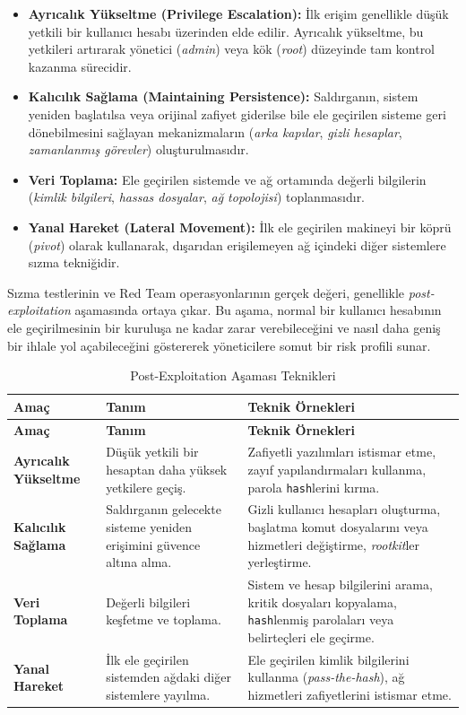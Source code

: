 \begin{itemize}
\item \textbf{Ayrıcalık Yükseltme (Privilege Escalation):} İlk erişim genellikle düşük yetkili bir kullanıcı hesabı üzerinden elde edilir. Ayrıcalık yükseltme, bu yetkileri artırarak yönetici (\textit{admin}) veya kök (\textit{root}) düzeyinde tam kontrol kazanma sürecidir.
\item \textbf{Kalıcılık Sağlama (Maintaining Persistence):} Saldırganın, sistem yeniden başlatılsa veya orijinal zafiyet giderilse bile ele geçirilen sisteme geri dönebilmesini sağlayan mekanizmaların (\textit{arka kapılar}, \textit{gizli hesaplar}, \textit{zamanlanmış görevler}) oluşturulmasıdır.
\item \textbf{Veri Toplama:} Ele geçirilen sistemde ve ağ ortamında değerli bilgilerin (\textit{kimlik bilgileri}, \textit{hassas dosyalar}, \textit{ağ topolojisi}) toplanmasıdır.
\item \textbf{Yanal Hareket (Lateral Movement):} İlk ele geçirilen makineyi bir köprü (\textit{pivot}) olarak kullanarak, dışarıdan erişilemeyen ağ içindeki diğer sistemlere sızma tekniğidir.
\end{itemize}

Sızma testlerinin ve Red Team operasyonlarının gerçek değeri, genellikle \textit{post-exploitation} aşamasında ortaya çıkar. Bu aşama, normal bir kullanıcı hesabının ele geçirilmesinin bir kuruluşa ne kadar zarar verebileceğini ve nasıl daha geniş bir ihlale yol açabileceğini göstererek yöneticilere somut bir risk profili sunar.

\begin{longtable}{|>{\scriptsize}p{1.5cm}|>{\scriptsize}p{1.8cm}|>{\scriptsize}p{2.2cm}|}
\caption{Post-Exploitation Aşaması Teknikleri}\\
\hline
\textbf{Amaç} & \textbf{Tanım} & \textbf{Teknik Örnekleri} \\
\hline
\endfirsthead
\hline
\textbf{Amaç} & \textbf{Tanım} & \textbf{Teknik Örnekleri} \\
\hline
\endhead
\textbf{Ayrıcalık Yükseltme} & Düşük yetkili bir hesaptan daha yüksek yetkilere geçiş. & Zafiyetli yazılımları istismar etme, zayıf yapılandırmaları kullanma, parola \texttt{hash}lerini kırma. \\
\hline
\textbf{Kalıcılık Sağlama} & Saldırganın gelecekte sisteme yeniden erişimini güvence altına alma. & Gizli kullanıcı hesapları oluşturma, başlatma komut dosyalarını veya hizmetleri değiştirme, \textit{rootkit}ler yerleştirme. \\
\hline
\textbf{Veri Toplama} & Değerli bilgileri keşfetme ve toplama. & Sistem ve hesap bilgilerini arama, kritik dosyaları kopyalama, \texttt{hash}lenmiş parolaları veya belirteçleri ele geçirme. \\
\hline
\textbf{Yanal Hareket} & İlk ele geçirilen sistemden ağdaki diğer sistemlere yayılma. & Ele geçirilen kimlik bilgilerini kullanma (\textit{pass-the-hash}), ağ hizmetleri zafiyetlerini istismar etme. \\
\hline
\end{longtable}

